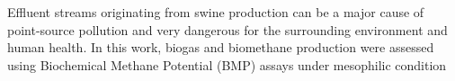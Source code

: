 Effluent streams originating from swine production can be a major cause of point-source pollution and very dangerous for the surrounding environment and human health. In this work, biogas and biomethane production were assessed using Biochemical Methane Potential (BMP) assays under mesophilic condition 